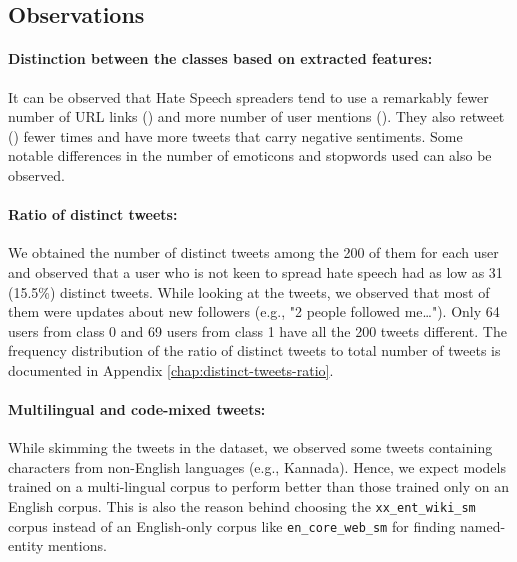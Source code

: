 \subsection{Observations}
\label{sec:dataset:eda-obs}
\paragraph{Distinction between the classes based on extracted features:} 
It can be observed that Hate Speech spreaders tend to use a remarkably fewer number of URL links (\maskUrl{}) and more number of user mentions (\maskUser{}). They also retweet (\maskRt{}) fewer times and have more tweets that carry negative sentiments. Some notable differences in the number of emoticons and stopwords used can also be observed.

\paragraph{Ratio of distinct tweets:}
We obtained the number of distinct tweets among the 200 of them for each user and observed that a user who is not keen to spread hate speech had as low as 31 (15.5\%) distinct tweets. While looking at the tweets, we observed that most of them were updates about new followers (e.g., "2 people followed me…"). Only 64 users from class 0 and 69 users from class 1 have all the 200 tweets different. The frequency distribution of the ratio of distinct tweets to total number of tweets is documented in Appendix \ref{chap:distinct-tweets-ratio}.

\paragraph{Multilingual and code-mixed tweets:} While skimming the tweets in the dataset, we observed some tweets containing characters from non-English languages (e.g., Kannada). Hence, we expect models trained on a multi-lingual corpus to perform better than those trained only on an English corpus. This is also the reason behind choosing the \texttt{xx\_ent\_wiki\_sm} corpus instead of an English-only corpus like \texttt{en\_core\_web\_sm} for finding named-entity mentions.


